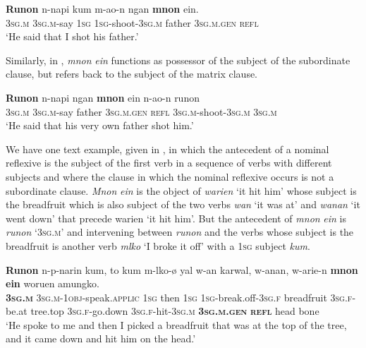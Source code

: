 \documentclass[output=paper]{langscibook}
\begin{document}
\ea%
    \label{ex:Brown:57}
    \gll \textbf{Runon}  n-napi  kum  m-ao-n  ngan  \textbf{mnon}  ein.\\
 \textsc{3sg.m}  \textsc{3sg.m}{}-say  \textsc{1sg}  \textsc{1sg}{}-shoot-\textsc{3sg.m}  father  \textsc{3sg.m.gen}  \textsc{refl}\\
    \glt  ‘He said that I shot his father.’
    \z


Similarly, in , \emph{mnon} \emph{ein} functions as possessor of the subject of the subordinate clause, but refers back to the subject of the matrix clause.


\ea%
    \label{ex:Brown:58}
    \gll \textbf{Runon}  n-napi  ngan  \textbf{mnon}  ein  n-ao-n  runon\\
 \textsc{3sg.m}  \textsc{3sg.m}{}-say  father  \textsc{3sg.m.gen}  \textsc{refl}  \textsc{3sg.m}{}-shoot-\textsc{3sg.m}  \textsc{3sg.m}\\
    \glt  ‘He said that his very own father shot him.’
    \z


  We have one text example, given in , in which the antecedent of a nominal reflexive is the subject of the first verb in a sequence of verbs with different subjects and where the clause in which the nominal reflexive occurs is not a subordinate clause. \emph{Mnon} \emph{ein} is the object of \emph{warien} ‘it hit him’ whose subject is the breadfruit which is also subject of the two verbs \emph{wan} ‘it was at’ and \emph{wanan} ‘it went down’ that precede warien ‘it hit him’. But the antecedent of \emph{mnon} \emph{ein} is \emph{runon} ‘\textsc{3sg.m}’ and intervening between \emph{runon} and the verbs whose subject is the breadfruit is another verb \emph{mlko} ‘I broke it off’ with a \textsc{1sg} subject \emph{kum}.




\ea%
    \label{ex:Brown:59}
    \gll \textbf{Runon}  n-p-narin  kum,  to  kum  m-lko-ø yal  w-an  karwal,  w-anan,  w-arie-n  \textbf{mnon}  \textbf{ein}  woruen  amungko.\\
 \textbf{\textsc{3sg.m}}  \textsc{3sg.m}{}-\textsc{1obj}{}-speak.\textsc{applic}  \textsc{1sg}  then  \textsc{1sg}  \textsc{1sg}{}-break.off-\textsc{3sg.f}  breadfruit  \textsc{3sg.f}{}-be.at  tree.top  \textsc{3sg.f}{}-go.down  \textsc{3sg.f}{}-hit-\textsc{3sg.m} \textbf{\textsc{3sg.m.gen}}  \textbf{\textsc{refl}}  head  bone\\
    \glt ‘He spoke to me and then I picked a breadfruit that was at the top of the tree, and it came down and hit him on the head.’
    \z
\end{document}
